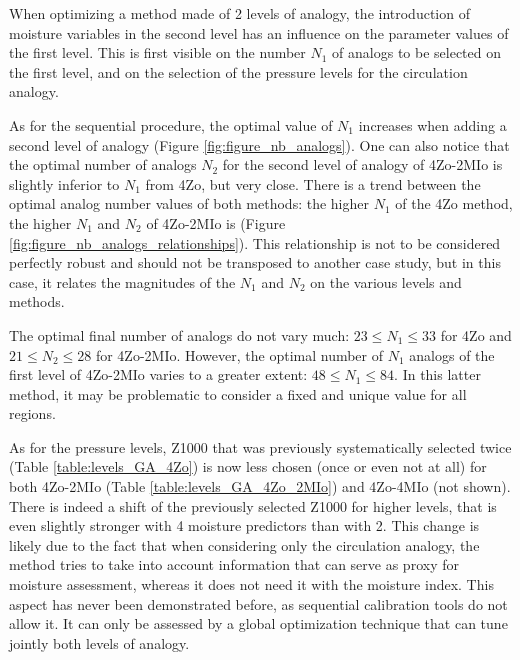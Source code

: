 \documentclass[review]{elsarticle}
\begin{document}
When optimizing a method made of 2 levels of analogy, the introduction of moisture variables in the second level has an influence on the parameter values of the first level. This is first visible on the number $N_{1}$ of analogs to be selected on the first level, and on the selection of the pressure levels for the circulation analogy. 

As for the sequential procedure, the optimal value of $N_{1}$ increases when adding a second level of analogy (Figure \ref{fig:figure_nb_analogs}). One can also notice that the optimal number of analogs $N_{2}$ for the second level of analogy of 4Zo-2MIo is slightly inferior to $N_{1}$ from 4Zo, but very close. There is a trend between the optimal analog number values of both methods: the higher $N_{1}$ of the 4Zo method, the higher $N_{1}$ and $N_{2}$ of 4Zo-2MIo is (Figure \ref{fig:figure_nb_analogs_relationships}). This relationship is not to be considered perfectly robust and should not be transposed to another case study, but in this case, it relates the magnitudes of the $N_{1}$ and $N_{2}$ on the various levels and methods. 

The optimal final number of analogs do not vary much: $23 \leq N_{1} \leq 33$ for 4Zo and $21 \leq N_{2} \leq 28$ for 4Zo-2MIo. However, the optimal number of $N_{1}$ analogs of the first level of 4Zo-2MIo varies to a greater extent: $48 \leq N_{1} \leq 84$. In this latter method, it may be problematic to consider a fixed and unique value for all regions.

As for the pressure levels, Z1000 that was previously systematically selected twice (Table \ref{table:levels_GA_4Zo}) is now less chosen (once or even not at all) for both 4Zo-2MIo (Table \ref{table:levels_GA_4Zo_2MIo}) and 4Zo-4MIo (not shown). There is indeed a shift of the previously selected Z1000 for higher levels, that is even slightly stronger with 4 moisture predictors than with 2. This change is likely due to the fact that when considering only the circulation analogy, the method tries to take into account information that can serve as proxy for moisture assessment, whereas it does not need it with the moisture index. This aspect has never been demonstrated before, as sequential calibration tools do not allow it. It can only be assessed by a global optimization technique that can tune jointly both levels of analogy. 
\end{document}
